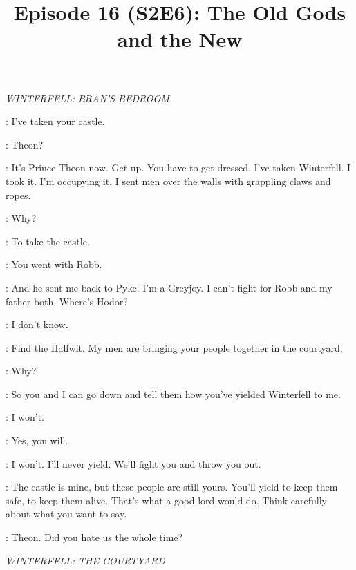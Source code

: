 

\title{Episode 16 (S2E6): The Old Gods and the New}
\author{}
\date{}
\maketitle



\scene

\textit{WINTERFELL: BRAN'S BEDROOM} 


\THEON: I've taken your castle. 

\BRAN: Theon? 

\THEON: It's Prince Theon now. Get up. You have to get dressed. I've taken Winterfell. I took it. I'm occupying it. I sent men over the walls with grappling claws and ropes. 

\BRAN: Why? 

\THEON: To take the castle. 

\BRAN: You went with Robb. 

\THEON: And he sent me back to Pyke. I'm a Greyjoy. I can't fight for Robb and my father both. Where's Hodor? 

\BRAN: I don't know. 

\THEON:  Find the Halfwit.  My men are bringing your people together in the courtyard. 

\BRAN: Why? 

\THEON: So you and I can go down and tell them how you've yielded Winterfell to me. 

\BRAN: I won't. 

\THEON: Yes, you will. 

\BRAN: I won't. I'll never yield. We'll fight you and throw you out. 

\THEON: The castle is mine, but these people are still yours. You'll yield to keep them safe, to keep them alive. That's what a good lord would do. Think carefully about what you want to say. 

\BRAN: Theon. Did you hate us the whole time? 


\scene

\textit{WINTERFELL: THE COURTYARD}


